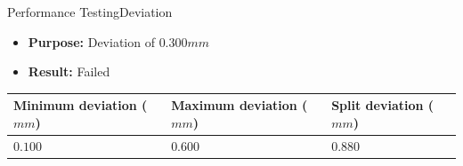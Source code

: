 \begin{frame}{Performance Testing}{Deviation}
\begin{itemize}
    \item \textbf{Purpose:} Deviation of $0.300 mm$
    \item \textbf{Result:} Failed
\end{itemize}
\begin{table}[!h]
    \centering
\begin{tabular}{m{2.7cm} m{2.7cm} m{2.0cm}}
    \hline
   \rowcolor{beamer@barcolor}  \small{Minimum deviation ($mm$)} &  \small{Maximum deviation ($mm$)} &  \small{Split deviation ($mm$)} \\
    \hline
     \small{$0.100$} &  \small{$0.600$} &  \small{$0.880$}\\ 
    \hline
\end{tabular}
\end{table}
\end{frame}